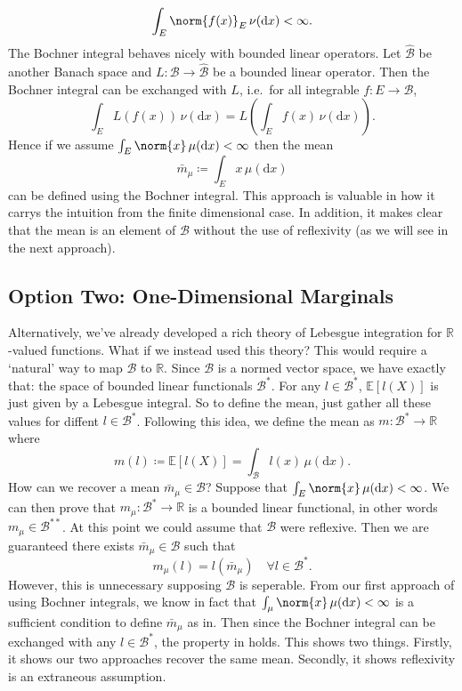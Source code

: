 \documentclass[fontsize=12pt, DIV=10]{scrreprt}
\theoremstyle{remark}
\newcommand{\defeq}{\coloneqq}
\newcommand{\R}{\mathbb R}
\newcommand{\E}{\mathbb E}
\newcommand{\calB}{\mathcal B}
\newcommand{\dif}[1]{\text{d} #1}
\begin{document}
\begin{equation}
	\int_E \norm{f(x)}_E \, \nu(\dif x) < \infty.
\end{equation}
The Bochner integral behaves nicely with bounded linear operators. Let $\hat{\calB}$ be another Banach space and $L: \calB \to \hat{\calB}$ be a bounded linear operator. Then the Bochner integral can be exchanged with $L$, i.e.\ for all integrable $f: E \to \calB$,
\begin{equation}
	\int_E L(f(x)) \, \nu(\dif x) = L\left( \int_E f(x) \, \nu(\dif x)\right).
\end{equation}
Hence if we assume $\int_E \norm{x} \, \mu(\dif x) < \infty$ then the mean
\begin{equation}
	\bar{m}_{\mu} \defeq \int_E x \, \mu(\dif x)
\end{equation}
can be defined using the Bochner integral. This approach is valuable in how it carrys the intuition from the finite dimensional case. In addition, it makes clear that the mean is an element of $\calB$ without the use of reflexivity (as we will see in the next approach). 

\subsection{Option Two: One-Dimensional Marginals}

Alternatively, we've already developed a rich theory of Lebesgue integration for $\R$-valued functions. What if we instead used this theory? This would require a `natural' way to map $\calB$ to $\R$. Since $\calB$ is a normed vector space, we have exactly that: the space of bounded linear functionals $\calB^*$. For any $l \in \calB^*$, $\E[l(X)]$ is just given by a Lebesgue integral. So to define the mean, just gather all these values for diffent $l \in \calB^*$. Following this idea, we define the mean as $m: \calB^* \to \R$ where
\begin{equation}
	m(l) \defeq \E[l(X)] = \int_{\calB} l(x) \, \mu(\dif x).
\end{equation}
How can we recover a mean $\bar{m}_{\mu} \in \calB$? Suppose that $\int_E \norm{x} \, \mu(\dif x) < \infty$. We can then prove that $m_{\mu}: \calB^* \to \R$ is a bounded linear functional, in other words $m_{\mu} \in \calB^{**}$. At this point we could assume that $\calB$ were reflexive. Then we are guaranteed there exists $\bar{m}_{\mu} \in \calB$ such that
\begin{equation}
	m_{\mu}(l) = l(\bar{m}_{\mu}) \quad \forall l \in \calB^*.
\end{equation}
However, this is unnecessary supposing $\calB$ is seperable. From our first approach of using Bochner integrals, we know in fact that $\int_{\mu} \norm{x} \, \mu(\dif x) < \infty$ is a sufficient condition to define $\bar{m}_{\mu}$ as in. Then since the Bochner integral can be exchanged with any $l \in \calB^*$, the property in holds. This shows two things. Firstly, it shows our two approaches recover the same mean. Secondly, it shows reflexivity is an extraneous assumption.
\end{document}
